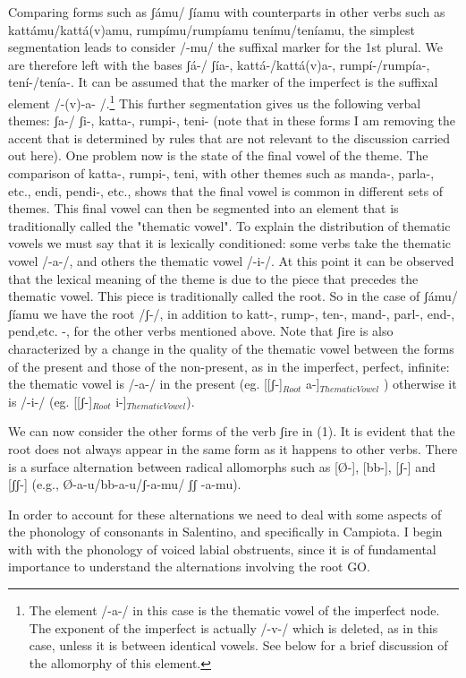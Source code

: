 \documentclass[output=paper,colorlinks,citecolor=brown,
]{langscibook}
\begin{document}
Comparing forms such as ʃámu/ ʃíamu with counterparts in other verbs such as  kattámu/kattá(v)amu, rumpímu/rumpíamu tenímu/teníamu, the simplest segmentation leads to consider /-mu/ the suffixal marker for the 1st plural. We are therefore left with the bases  ʃá-/ ʃía-, kattá-/kattá(v)a-, rumpí-/rumpía-, tení-/tenía-.  It can be assumed that the marker of the imperfect is  the suffixal element /-(v)-a- /.\footnote{The element /-a-/ in this case is the thematic vowel of the imperfect node.  The exponent of the imperfect is actually /-v-/ which is deleted, as in this case, unless it is between identical vowels.  See below for a brief discussion of the allomorphy of this element.} This further segmentation gives us the following verbal themes:  ʃa-/ ʃi-, katta-, rumpi-, teni-  (note that in these forms I am removing the accent that is determined by rules that are not relevant to the discussion carried out here). One problem now is the state of the final vowel of the theme. The comparison of  katta-, rumpi-, teni, with other themes such as  manda-, parla-, etc.,  endi, pendi-,  etc., shows that the final vowel is common in different sets of  themes.  This final vowel can then be segmented into an element that is traditionally called  the  "thematic vowel". To explain the distribution of thematic vowels we must say that it is lexically  conditioned:  some verbs take the thematic  vowel  /-a-/, and others the thematic vowel  /-i-/. At this point it can be observed that the lexical meaning of the  theme  is  due to the piece that precedes the thematic vowel. This piece is traditionally called the root. So in the case of ʃámu/ ʃíamu  we have the root /ʃ-/, in addition to  katt-, rump-, ten-, mand-, parl-, end-, pend,etc. -,  for the other verbs mentioned above.  Note that  ʃire  is also characterized by a change in the quality of the thematic vowel between the forms of the present and those of the non-present, as in the imperfect, perfect, infinite: the thematic vowel is /-a-/ in the present  (eg. [[ʃ-]$_{Root}$  a-]$_{Thematic Vowel}$ ) otherwise it is  /-i-/ (eg. [[ʃ-]$_{Root}$  i-]$_{ThematicVowel}$).

We can now consider the other forms of the verb ʃire  in  (1).  It is evident that the root does not always appear in the same form as it happens to other verbs.  There is a surface alternation between radical allomorphs such as  [Ø-], [bb-], [ʃ-]  and  [ʃʃ-]  (e.g.,  Ø-a-u/bb-a-u/ʃ-a-mu/ ʃʃ -a-mu).  

In order to account for these alternations we need to deal with some aspects of the phonology of consonants in Salentino, and specifically in Campiota.   I begin with with the phonology of voiced labial obstruents, since it is of fundamental importance to understand the alternations involving the root GO.  
\end{document}
